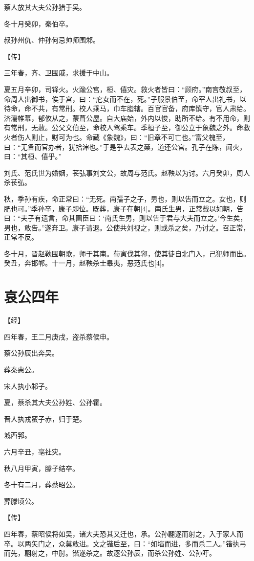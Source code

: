 \documentclass[a4paper,12pt,UTF8,twoside]{ctexbook}
\begin{document}
蔡人放其大夫公孙猎于吴。

冬十月癸卯，秦伯卒。

叔孙州仇、仲孙何忌帅师围邾。

【传】

三年春，齐、卫围戚，求援于中山。

夏五月辛卯，司铎火。火踰公宫，桓、僖灾。救火者皆曰：“顾府。”南宫敬叔至，命周人出御书，俟于宫，曰：“庀女而不在，死。”子服景伯至，命宰人出礼书，以待命，命不共，有常刑。校人乘马，巾车脂辖。百官官备，府库慎守，官人肃给。济濡帷幕，郁攸从之，蒙葺公屋。自大庙始，外内以悛，助所不给。有不用命，则有常刑，无赦。公父文伯至，命校人驾乘车。季桓子至，御公立于象魏之外。命救火者伤人则止，财可为也。命藏《象魏》，曰：“旧章不可亡也。”富父槐至，曰：“无备而官办者，犹拾渖也。”于是乎去表之槀，道还公宫。孔子在陈，闻火，曰：“其桓、僖乎。”

刘氏、范氏世为婚姻，苌弘事刘文公，故周与范氏。赵鞅以为讨。六月癸卯，周人杀苌弘。

秋，季孙有疾，命正常曰：“无死。南孺子之子，男也，则以告而立之。女也，则肥也可。”季孙卒，康子即位。既葬，康子在朝[4]。南氏生男，正常载以如朝，告曰：“夫子有遗言，命其圉臣曰：‘南氏生男，则以告于君与大夫而立之。’今生矣，男也，敢告。”遂奔卫。康子请退。公使共刘视之，则或杀之矣，乃讨之。召正常，正常不反。

冬十月，晋赵鞅围朝歌，师于其南。荀寅伐其郛，使其徒自北门入，己犯师而出。癸丑，奔邯郸。十一月，赵鞅杀士皋夷，恶范氏也[4]。


\section{哀公四年}



【经】

四年春，王二月庚戌，盗杀蔡侯申。

蔡公孙辰出奔吴。

葬秦惠公。

宋人执小邾子。

夏，蔡杀其大夫公孙姓、公孙霍。

晋人执戎蛮子赤，归于楚。

城西郛。

六月辛丑，亳社灾。

秋八月甲寅，滕子结卒。

冬十有二月，葬蔡昭公。

葬滕顷公。

【传】

四年春，蔡昭侯将如吴，诸大夫恐其又迁也，承。公孙翩逐而射之，入于家人而卒。以两矢门之，众莫敢进。文之锴后至，曰：“如墙而进，多而杀二人。”锴执弓而先，翩射之，中肘。锴遂杀之。故逐公孙辰，而杀公孙姓、公孙盱。
\end{document}

